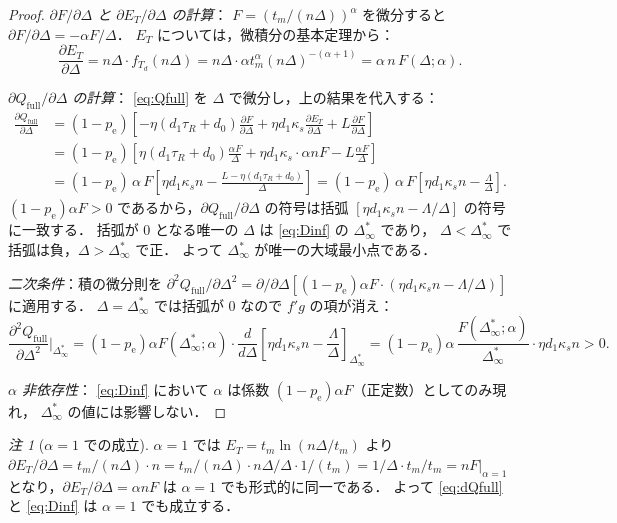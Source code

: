 \documentclass[12pt,a4paper]{article}
\theoremstyle{plain}
\theoremstyle{definition}
\theoremstyle{remark}
\newtheorem{remark}[theorem]{注}
\newcommand{\pe}{p_{\mathrm{e}}}
\newcommand{\Qf}{Q_{\mathrm{full}}}
\newcommand{\Dinf}{\Delta^{*}_{\infty}}
\newcommand{\La}{\Lambda}   %
\begin{document}
\begin{proof}
\emph{$\partial F/\partial\Delta$ と $\partial E_T/\partial\Delta$ の計算}：
$F=(t_m/(n\Delta))^\alpha$ を微分すると $\partial F/\partial\Delta=-\alpha F/\Delta$．
$E_T$ については，微積分の基本定理から：
\[
\frac{\partial E_T}{\partial\Delta}
=n\Delta\cdot f_{T_d}(n\Delta)
=n\Delta\cdot\alpha t_m^\alpha(n\Delta)^{-(\alpha+1)}
=\alpha\,n\,F(\Delta;\alpha).
\]

\emph{$\partial\Qf/\partial\Delta$ の計算}：
\eqref{eq:Qfull} を $\Delta$ で微分し，上の結果を代入する：
\begin{align*}
\frac{\partial\Qf}{\partial\Delta}
&=(1-\pe)\!\left[
-\eta(d_1\tau_R+d_0)\frac{\partial F}{\partial\Delta}
+\eta d_1\kappa_s\frac{\partial E_T}{\partial\Delta}
+L\frac{\partial F}{\partial\Delta}
\right]\\
&=(1-\pe)\!\left[
\eta(d_1\tau_R+d_0)\frac{\alpha F}{\Delta}
+\eta d_1\kappa_s\cdot\alpha n F
-L\frac{\alpha F}{\Delta}
\right]\\
&=(1-\pe)\,\alpha\,F\!\left[
\eta d_1\kappa_s n
-\frac{L-\eta(d_1\tau_R+d_0)}{\Delta}
\right]
=(1-\pe)\,\alpha\,F\!\left[\eta d_1\kappa_s n-\frac{\La}{\Delta}\right].
\end{align*}
$(1-\pe)\alpha F>0$ であるから，$\partial\Qf/\partial\Delta$ の符号は括弧
$[\eta d_1\kappa_s n-\La/\Delta]$ の符号に一致する．
括弧が 0 となる唯一の $\Delta$ は \eqref{eq:Dinf} の $\Dinf$ であり，
$\Delta<\Dinf$ で括弧は負，$\Delta>\Dinf$ で正．
よって $\Dinf$ が唯一の大域最小点である．

\emph{二次条件}：積の微分則を $\partial^2\Qf/\partial\Delta^2
=\partial/\partial\Delta[(1-\pe)\alpha F\cdot(\eta d_1\kappa_s n-\La/\Delta)]$ に適用する．
$\Delta=\Dinf$ では括弧が 0 なので $f'g$ の項が消え：
\[
\frac{\partial^2\Qf}{\partial\Delta^2}\bigg|_{\Dinf}
=(1-\pe)\alpha F(\Dinf;\alpha)\cdot\frac{d}{d\Delta}\!\left[\eta d_1\kappa_s n-\frac{\La}{\Delta}\right]_{\!\Dinf}
=(1-\pe)\alpha\,\frac{F(\Dinf;\alpha)}{\Dinf}\cdot\eta d_1\kappa_s n>0.
\]

\emph{$\alpha$ 非依存性}：
\eqref{eq:Dinf} において $\alpha$ は係数 $(1-\pe)\alpha F$（正定数）としてのみ現れ，
$\Dinf$ の値には影響しない．
\end{proof}

\begin{remark}[$\alpha=1$ での成立]\label{rem:alpha1}
$\alpha=1$ では $E_T=t_m\ln(n\Delta/t_m)$ より
$\partial E_T/\partial\Delta=t_m/(n\Delta)\cdot n=t_m/(n\Delta)\cdot n\Delta/\Delta\cdot1/(t_m)=1/\Delta\cdot t_m/t_m=nF|_{\alpha=1}$
となり，$\partial E_T/\partial\Delta=\alpha nF$ は $\alpha=1$ でも形式的に同一である．
よって \eqref{eq:dQfull} と \eqref{eq:Dinf} は $\alpha=1$ でも成立する．
\end{remark}
\end{document}
